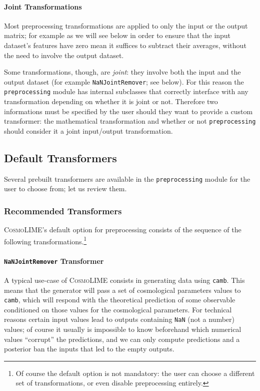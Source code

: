 \paragraph{Joint Transformations}
Most preprocessing transformations are applied to only the input or the output matrix; for example as we will see below in order to ensure that the input dataset's features have zero mean it suffices to subtract their averages, without the need to involve the output dataset.

Some transformations, though, are \emph{joint}: they involve both the input and the output dataset (for example \texttt{NaNJointRemover}; see below). For this reason the \texttt{preprocessing} module has internal subclasses that correctly interface with any transformation depending on whether it is joint or not. Therefore two informations must be specified by the user should they want to provide a custom transformer: the mathematical transformation and whether or not \texttt{preprocessing} should consider it a joint input/output transformation.

\subsection{Default Transformers}\label{subsec:default_transformers}
Several prebuilt transformers are available in the \texttt{preprocessing} module for the user to choose from; let us review them. 
\subsubsection{Recommended Transformers}
\textsc{CosmoLIME}'s default option for preprocessing consists of the sequence of the following transformations.\footnote{Of course the default option is not mandatory: the user can choose a different set of transformations, or even disable preprocessing entirely.}

\paragraph{\texttt{NaNJointRemover} Transformer}
A typical use-case of \textsc{CosmoLIME} consists in generating data using \texttt{camb}. This means that the generator will pass a set of cosmological parameters values to \texttt{camb}, which will respond with the theoretical prediction of some observable conditioned on those values for the cosmological parameters. For technical reasons certain input values lead to outputs containing \texttt{NaN} (not a number) values; of course it usually is impossible to know beforehand which numerical values ``corrupt'' the predictions, and we can only compute predictions and a posterior ban the inputs that led to the empty outputs.

